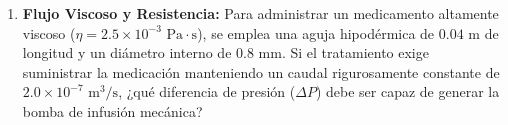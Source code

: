 \documentclass[11pt,letterpaper]{article}
\begin{document}
\begin{enumerate}
    \item \textbf{Flujo Viscoso y Resistencia:} Para administrar un medicamento altamente viscoso ($\eta = 2.5 \times 10^{-3} \text{ Pa}\cdot\text{s}$), se emplea una aguja hipodérmica de $0.04 \text{ m}$ de longitud y un diámetro interno de $0.8 \text{ mm}$. Si el tratamiento exige suministrar la medicación manteniendo un caudal rigurosamente constante de $2.0 \times 10^{-7} \text{ m}^3\text{/s}$, ¿qué diferencia de presión ($\Delta P$) debe ser capaz de generar la bomba de infusión mecánica?
    \vspace{0.8cm}

\end{enumerate}
\end{document}
